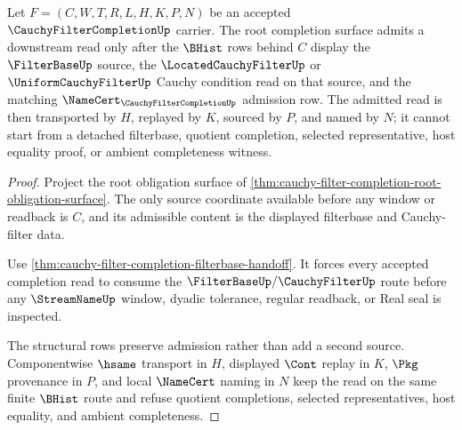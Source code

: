 \begin{theorem}
\label{thm:cauchy-filter-completion-filterbase-admission}
Let $F=(C,W,T,R,L,H,K,P,N)$ be an accepted $\CauchyFilterCompletionUp$ carrier. The root completion surface admits a downstream read only after the $\BHist$ rows behind $C$ display the $\FilterBaseUp$ source, the $\LocatedCauchyFilterUp$ or $\UniformCauchyFilterUp$ Cauchy condition read on that source, and the matching $\NameCert_{\CauchyFilterCompletionUp}$ admission row. The admitted read is then transported by $H$, replayed by $K$, sourced by $P$, and named by $N$; it cannot start from a detached filterbase, quotient completion, selected representative, host equality proof, or ambient completeness witness.
\end{theorem}
\begin{proof}
Project the root obligation surface of \autoref{thm:cauchy-filter-completion-root-obligation-surface}. The only source coordinate available before any window or readback is $C$, and its admissible content is the displayed filterbase and Cauchy-filter data.

Use \autoref{thm:cauchy-filter-completion-filterbase-handoff}. It forces every accepted completion read to consume the $\FilterBaseUp/\CauchyFilterUp$ route before any $\StreamNameUp$ window, dyadic tolerance, regular readback, or Real seal is inspected.

The structural rows preserve admission rather than add a second source. Componentwise $\hsame$ transport in $H$, displayed $\Cont$ replay in $K$, $\Pkg$ provenance in $P$, and local $\NameCert$ naming in $N$ keep the read on the same finite $\BHist$ route and refuse quotient completions, selected representatives, host equality, and ambient completeness.
\end{proof}

